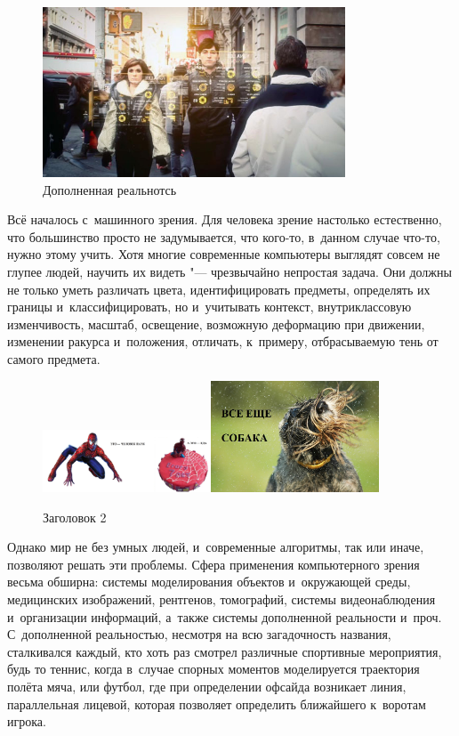 \documentclass[final,pdftex]{../../template/epsilonj}
\begin{document}
\begin{figure}[htbp]
\centering 	\includegraphics[width=90mm]{1.jpg}
\caption{Дополненная реальнотсь} 
\end{figure}

Всё началось с~машинного зрения. Для человека зрение настолько естественно, что большинство просто не задумывается, что кого-то, в~данном случае что-то, нужно этому учить. Хотя многие современные компьютеры выглядят совсем не глупее людей, научить их видеть "--- чрезвычайно непростая задача. Они должны не только уметь различать цвета, идентифицировать предметы, определять их границы и~классифицировать, но и~учитывать контекст, внутриклассовую изменчивость, масштаб, освещение, возможную деформацию при движении, изменении ракурса и~положения, отличать, к~примеру, отбрасываемую тень от самого предмета.
\begin{figure}[htbp]
\centering 
\includegraphics[width=50mm]{tt.jpg}\quad\includegraphics[width=50mm]{dd.jpg}
\caption{Заголовок 2}
\end{figure}

Однако мир не без умных людей, и~современные алгоритмы, так или иначе, позволяют решать эти проблемы. Сфера применения компьютерного зрения весьма обширна: системы моделирования объектов и~окружающей среды, медицинских изображений, рентгенов, томографий, системы видеонаблюдения и~организации информаций, а~также системы дополненной реальности и~проч. С~дополненной реальностью, несмотря на всю загадочность названия, сталкивался каждый, кто хоть раз смотрел различные спортивные мероприятия, будь то теннис, когда в~случае спорных моментов моделируется траектория полёта мяча, или футбол, где при определении офсайда возникает линия, параллельная лицевой, которая позволяет определить ближайшего к~воротам игрока.
\end{document}
